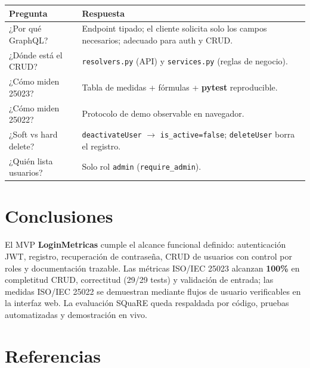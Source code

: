 \documentclass[11pt,a4paper]{article}
\begin{document}
\begin{table}[h]
  \centering
  \small
  \begin{tabular}{@{}p{4.5cm}p{9.5cm}@{}}
    \toprule
    \textbf{Pregunta} & \textbf{Respuesta} \\
    \midrule
    ¿Por qué GraphQL? & Endpoint tipado; el cliente solicita solo los campos necesarios; adecuado para auth y CRUD. \\
    ¿Dónde está el CRUD? & \texttt{resolvers.py} (API) y \texttt{services.py} (reglas de negocio). \\
    ¿Cómo miden 25023? & Tabla de medidas + fórmulas + \textbf{pytest} reproducible. \\
    ¿Cómo miden 25022? & Protocolo de demo observable en navegador. \\
    ¿Soft vs hard delete? & \texttt{deactivateUser} $\rightarrow$ \texttt{is\_active=false}; \texttt{deleteUser} borra el registro. \\
    ¿Quién lista usuarios? & Solo rol \texttt{admin} (\texttt{require\_admin}). \\
    \bottomrule
  \end{tabular}
\end{table}

\section{Conclusiones}

El MVP \textbf{LoginMetricas} cumple el alcance funcional definido: autenticación JWT, registro, recuperación de contraseña, CRUD de usuarios con control por roles y documentación trazable. Las métricas ISO/IEC 25023 alcanzan \textbf{100\%} en completitud CRUD, correctitud (29/29 tests) y validación de entrada; las medidas ISO/IEC 25022 se demuestran mediante flujos de usuario verificables en la interfaz web. La evaluación SQuaRE queda respaldada por código, pruebas automatizadas y demostración en vivo.

\section*{Referencias}
\end{document}
